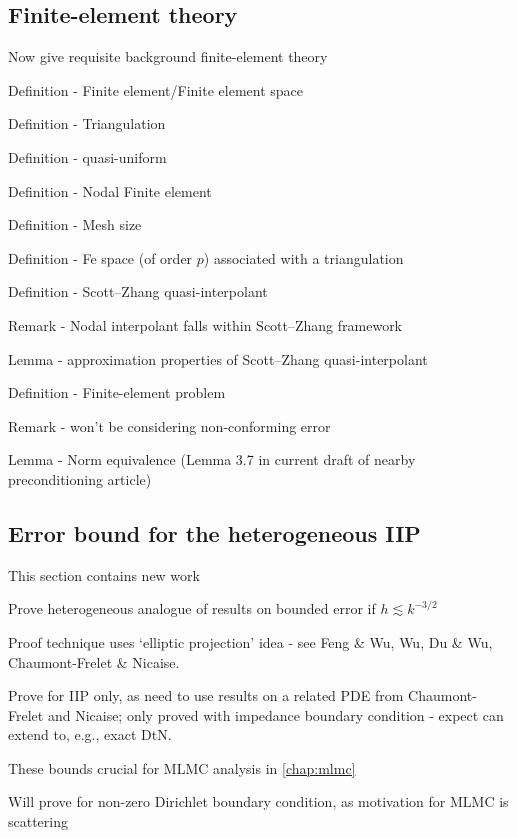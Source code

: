 \subsection{Finite-element theory}
Now give requisite background finite-element theory
\bit
\item Definition - Finite element/Finite element space
\item Definition - Triangulation
\item Definition - quasi-uniform
\item Definition - Nodal Finite element
\item Definition - Mesh size
\item Definition - Fe space (of order $p$) associated with a triangulation
\item Definition - Scott--Zhang quasi-interpolant
\item Remark - Nodal interpolant falls within Scott--Zhang framework
\item Lemma - approximation properties of Scott--Zhang quasi-interpolant
\item Definition - Finite-element problem
\item Remark - won't be considering non-conforming error
\item Lemma - Norm equivalence (Lemma 3.7 in current draft of nearby preconditioning article)
\eit

\subsection{Error bound for the heterogeneous IIP}\label{sec:errbound}
\bit
\item This section contains new work
\item Prove heterogeneous analogue of results on bounded error if $h \lesssim k^{-3/2}$
\item Proof technique uses `elliptic projection' idea - see Feng \& Wu, Wu, Du \& Wu, Chaumont-Frelet \& Nicaise.
\item Prove for IIP only, as need to use results on a related PDE from Chaumont-Frelet and Nicaise; only proved with impedance boundary condition - expect can extend to, e.g., exact DtN.
\item These bounds crucial for MLMC analysis in \cref{chap:mlmc}
\item Will prove for non-zero Dirichlet boundary condition, as motivation for MLMC is scattering
\eit

